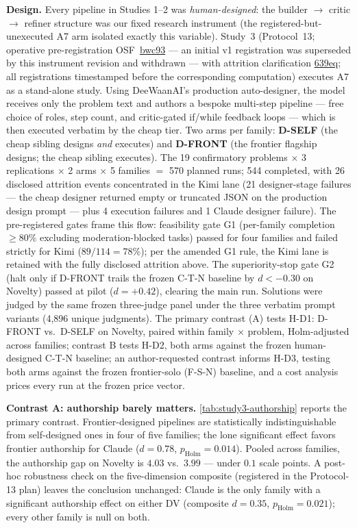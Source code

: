 \documentclass[12pt,a4paper]{article}
\begin{document}
\textbf{Design.} Every pipeline in Studies 1--2 was \emph{human-designed}: the
builder $\to$ critic $\to$ refiner structure was our fixed research instrument
(the registered-but-unexecuted A7 arm isolated exactly this variable).
Study~3 (Protocol~13; operative pre-registration
OSF~\href{https://osf.io/bwc93}{bwc93} --- an initial v1 registration
was superseded by this instrument revision and withdrawn --- with
attrition clarification \href{https://osf.io/639eq}{639eq}; all
registrations timestamped before the corresponding computation)
executes A7 as a stand-alone study. Using
DeeWaanAI's production auto-designer, the model receives only the problem text and authors
a bespoke multi-step pipeline --- free choice of roles, step count, and
critic-gated if/while feedback loops --- which is then executed verbatim by
the cheap tier. Two arms per family: \textbf{D-SELF} (the cheap sibling
designs \emph{and} executes) and \textbf{D-FRONT} (the frontier flagship
designs; the cheap sibling executes). The 19 confirmatory problems
$\times$ 3 replications $\times$ 2 arms $\times$ 5 families $=$ 570 planned
runs; 544 completed, with 26 disclosed attrition events concentrated in the
Kimi lane (21 designer-stage failures --- the cheap designer returned empty or
truncated JSON on the production design prompt --- plus 4 execution failures
and 1 Claude designer failure). The pre-registered gates frame this flow:
feasibility gate G1 (per-family completion $\geq 80\%$ excluding
moderation-blocked tasks) passed for four families and failed strictly for
Kimi ($89/114 = 78\%$); per the amended G1 rule, the Kimi lane is retained
with the fully disclosed attrition above. The superiority-stop gate G2 (halt
only if D-FRONT trails the frozen C-T-N baseline by $d < -0.30$ on Novelty)
passed at pilot ($d = +0.42$), clearing the main run. Solutions were judged by the same frozen
three-judge panel under the three verbatim prompt variants (4{,}896 unique
judgments). The primary contrast (A) tests H-D1: D-FRONT vs.\ D-SELF on Novelty,
paired within family $\times$ problem, Holm-adjusted across families;
contrast B tests H-D2, both arms against the frozen human-designed C-T-N
baseline; an author-requested contrast informs H-D3, testing both arms
against the frozen frontier-solo (F-S-N) baseline, and a cost analysis
prices every run at the frozen price vector.

\textbf{Contrast A: authorship barely matters.}
\cref{tab:study3-authorship} reports the primary contrast. Frontier-designed
pipelines are statistically indistinguishable from self-designed ones in four
of five families; the lone significant effect favors frontier authorship for
Claude ($d = 0.78$, $p_{\text{Holm}} = 0.014$). Pooled across families, the
authorship gap on Novelty is $4.03$ vs.\ $3.99$ --- under $0.1$ scale points.
A post-hoc robustness check on the five-dimension composite (registered in
the Protocol-13 plan) leaves the conclusion unchanged: Claude is the only
family with a significant authorship effect on either DV (composite
$d = 0.35$, $p_{\text{Holm}} = 0.021$); every other family is null on both.
\end{document}
